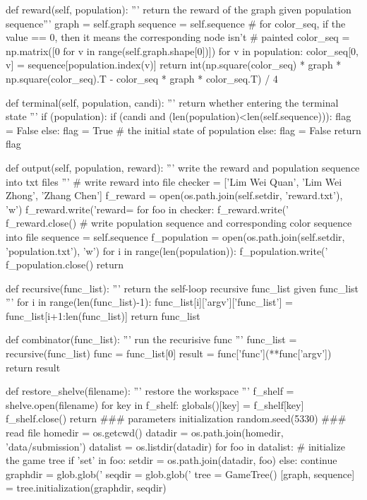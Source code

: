 \documentclass{article}
\begin{document}
\begin{python}[moreemph={[4]42},caption={A General Framework of MCTS based on Python},label=ex1]
    def reward(self, population):
        ''' return the reward of the graph given population sequence'''
        graph = self.graph
        sequence = self.sequence
        # for color_seq, if the value == 0, then it means the corresponding node isn't
        # painted
        color_seq = np.matrix([0 for v in range(self.graph.shape[0])])
        for v in population:
            color_seq[0, v] = sequence[population.index(v)]
        return int(np.square(color_seq) * graph * np.square(color_seq).T - color_seq * graph * color_seq.T) / 4
        
    def terminal(self, population, candi):
        ''' return whether entering the terminal state '''
        if (population):
            if (candi and (len(population)<len(self.sequence))):
                flag = False
            else:
                flag = True
        # the initial state of population
        else:
            flag = False
        return flag
        

    def output(self, population, reward):
        ''' write the reward and population sequence into txt files '''
        # write reward into file    
        checker = ['Lim Wei Quan', 'Lim Wei Zhong', 'Zhang Chen']
        f_reward = open(os.path.join(self.setdir, 'reward.txt'), 'w')
        f_reward.write('reward=%
        for foo in checker:
            f_reward.write('%
        f_reward.close()
        # write population sequence and corresponding color sequence into file
        sequence = self.sequence
        f_population = open(os.path.join(self.setdir, 'population.txt'), 'w')
        for i in range(len(population)):
            f_population.write('%
        f_population.close()
        return 
    
    
def recursive(func_list):
    ''' return the self-loop recursive func_list given func_list '''
    for i in range(len(func_list)-1):
        func_list[i]['argv']['func_list'] = func_list[i+1:len(func_list)]
    return func_list  
 
def combinator(func_list):
    ''' run the recurisive func '''
    func_list = recursive(func_list)
    func = func_list[0]
    result = func['func'](**func['argv'])
    return result
    
def restore_shelve(filename):
    ''' restore the workspace '''
    f_shelf = shelve.open(filename)
    for key in f_shelf:
        globals()[key] = f_shelf[key]
    f_shelf.close()
    return 
### parameters initialization
random.seed(5330)
### read file    
homedir = os.getcwd()
datadir = os.path.join(homedir, 'data/submission')
datalist = os.listdir(datadir)
for foo in datalist:
    # initialize the game tree
    if 'set' in foo:
        setdir = os.path.join(datadir, foo)
    else:
        continue
    graphdir = glob.glob('%
    seqdir = glob.glob('%
    tree = GameTree()
    [graph, sequence] = tree.initialization(graphdir, seqdir)


\end{python}
\end{document}
